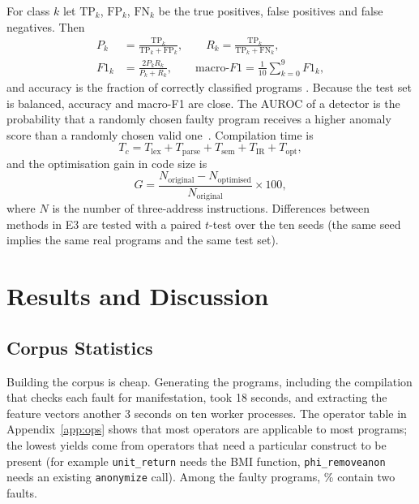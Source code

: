 \documentclass[conference]{IEEEtran}
\newcommand{\code}[1]{\texttt{#1}}
\begin{document}
For class $k$ let $\mathrm{TP}_k$, $\mathrm{FP}_k$, $\mathrm{FN}_k$ be the true positives, false positives and false
negatives. Then
\begin{align}
P_k&=\frac{\mathrm{TP}_k}{\mathrm{TP}_k+\mathrm{FP}_k},\qquad
R_k=\frac{\mathrm{TP}_k}{\mathrm{TP}_k+\mathrm{FN}_k},\\
F1_k&=\frac{2P_kR_k}{P_k+R_k},\qquad
\text{macro-}F1=\frac1{10}\sum_{k=0}^{9}F1_k,
\end{align}
and accuracy is the fraction of correctly classified programs \cite{sokolova2009}. Because the test set is balanced,
accuracy and macro-F1 are close. The AUROC of a detector is the probability that a randomly chosen faulty program
receives a higher anomaly score than a randomly chosen valid one~\cite{fawcett2006}. Compilation time is
\begin{equation}
T_c=T_{\text{lex}}+T_{\text{parse}}+T_{\text{sem}}+T_{\text{IR}}+T_{\text{opt}},
\end{equation}
and the optimisation gain in code size is
\begin{equation}
G=\frac{N_{\text{original}}-N_{\text{optimised}}}{N_{\text{original}}}\times 100,
\end{equation}
where $N$ is the number of three-address instructions. Differences between methods in E3 are tested with a paired
$t$-test over the ten seeds (the same seed implies the same real programs and the same test set).


\section{Results and Discussion}\label{sec:results}

\subsection{Corpus Statistics}

Building the corpus is cheap. Generating the \NProg{} programs, including the compilation that checks each fault
for manifestation, took 18 seconds, and extracting the feature vectors another 3 seconds on ten worker processes. The
operator table in Appendix~\ref{app:ops} shows that most operators are applicable to most programs; the lowest yields come from
operators that need a particular construct to be present (for example \code{unit\_return} needs the BMI function,
\code{phi\_removeanon} needs an existing \code{anonymize} call). Among the faulty programs, \DoubleShare\% contain two
faults.
\end{document}
